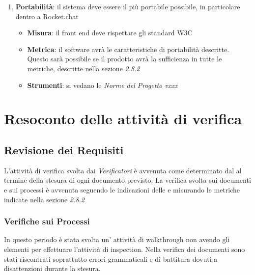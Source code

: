 {\begin{enumerate}
  \item \textbf{Portabilità}: il sistema deve essere il più portabile possibile, in particolare dentro a Rocket.chat
    \begin{itemize}
    \item \textbf{Misura}: il front end deve rispettare gli standard W3C
    \item \textbf{Metrica}: il software avrà le caratteristiche di
      portabilità descritte. Questo sarà possibile se il prodotto
      avrà la sufficienza in tutte le metriche, descritte nella sezione \emph{2.8.2}
    \item \textbf{Strumenti}: si vedano le \emph{Norme del Progetto vxxx}
    \end{itemize}
  \end{enumerate}




  \section{Resoconto delle attività di verifica}

  \subsection{Revisione dei Requisiti}

  L'attività di verifica svolta dai  \emph{Verificatori}  è avvenuta come determinato dal \emph{\pianodiprogetto} al termine della stesura di ogni documento previsto. La verifica svolta sui documenti e
  sui processi è avvenuta seguendo le indicazioni delle  \emph{\normediprogetto}  e misurando le
  metriche indicate nella sezione \emph{2.8.2}

  \subsubsection{Verifiche sui Processi}

  In questo periodo è stata svolta un' attività di walkthrough non avendo gli elementi
  per effettuare l'attività di inspection. Nella verifica dei
  documenti sono stati riscontrati soprattutto errori grammaticali e
  di battitura dovuti a disattenzioni durante la stesura. 

}
